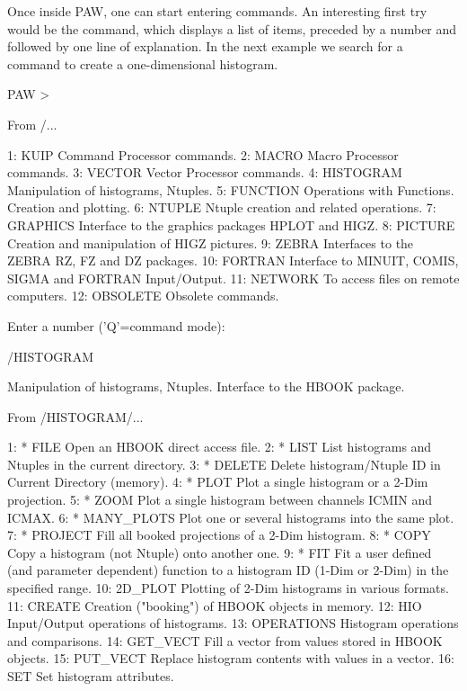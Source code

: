 Once inside PAW, one can start entering commands.
An interesting first try would be the  command,
which displays a list of items, preceded by a number
and followed by one line of explanation.
In the next example we search for a command to
create a one-dimensional histogram.
\begin{falltt}
      PAW > 
 
From  /...

 1:   KUIP          Command Processor commands.
 2:   MACRO         Macro Processor commands.
 3:   VECTOR        Vector Processor commands.
 4:   HISTOGRAM     Manipulation of histograms, Ntuples.
 5:   FUNCTION      Operations with Functions. Creation and plotting.
 6:   NTUPLE        Ntuple creation and related operations.
 7:   GRAPHICS      Interface to the graphics packages HPLOT and HIGZ.
 8:   PICTURE       Creation and manipulation of HIGZ pictures.
 9:   ZEBRA         Interfaces to the ZEBRA RZ, FZ and DZ packages.
10:   FORTRAN       Interface to MINUIT, COMIS, SIGMA and FORTRAN
                    Input/Output.
11:   NETWORK       To access files on remote computers.
12:   OBSOLETE      Obsolete commands.

Enter a number ('Q'=command mode):  

   /HISTOGRAM

   Manipulation of histograms, Ntuples.  Interface to the HBOOK package.


From  /HISTOGRAM/...

 1: * FILE          Open an HBOOK direct access file.
 2: * LIST          List histograms and Ntuples in the current directory.
 3: * DELETE        Delete histogram/Ntuple ID in Current Directory
                    (memory).
 4: * PLOT          Plot a single histogram or a 2-Dim projection.
 5: * ZOOM          Plot a single histogram between channels ICMIN and
                    ICMAX.
 6: * MANY_PLOTS    Plot one or several histograms into the same plot.
 7: * PROJECT       Fill all booked projections of a 2-Dim histogram.
 8: * COPY          Copy a histogram (not Ntuple) onto another one.
 9: * FIT           Fit a user defined (and parameter dependent) function
                    to a histogram ID (1-Dim or 2-Dim) in the specified
                    range.
10:   2D_PLOT       Plotting of 2-Dim histograms in various formats.
11:   CREATE        Creation ("booking") of HBOOK objects in memory.
12:   HIO           Input/Output operations of histograms.
13:   OPERATIONS    Histogram operations and comparisons.
14:   GET_VECT      Fill a vector from values stored in HBOOK objects.
15:   PUT_VECT      Replace histogram contents with values in a vector.
16:   SET           Set histogram attributes.


\end{falltt}

